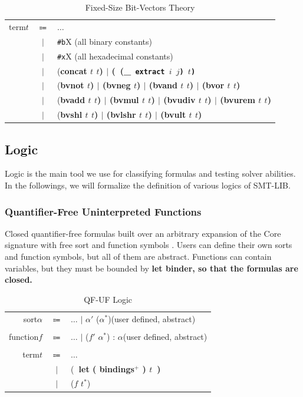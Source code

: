 \documentclass[10pt,twocolumn,letter]{article}
\theoremstyle{definition}
\begin{document}
\begin{table}[!h]
\begin{mdframed}
\begin{tabular}{r c l}
term\qquad $t$ & $\Coloneqq$ & $\ldots$ \\
& $\mid$ & {\tt \#b}X \rm\qquad (all binary constants)\\
& $\mid$ & {\tt \#x}X \rm\qquad (all hexadecimal constants)\\
& $\mid$ & (\bf concat \rm $t$ $t$) $\mid$ (\ (\_\tt\ {\bf extract} \rm $i$ $j$)\ $t$)\\
& $\mid$ & (\bf bvnot \rm $t$) $\mid$ (\bf bvneg \rm $t$) $\mid$ (\bf bvand \rm $t$ $t$) $\mid$ (\bf bvor \rm $t$ $t$)\\
& $\mid$ & (\bf bvadd \rm $t$ $t$) $\mid$ (\bf bvmul \rm $t$ $t$) $\mid$ (\bf bvudiv \rm $t$ $t$) $\mid$ (\bf bvurem \rm $t$ $t$)\\
& $\mid$ & (\bf bvshl \rm $t$ $t$) $\mid$ (\bf bvlshr \rm $t$ $t$) $\mid$ (\bf bvult \rm $t$ $t$) \\
\end{tabular}
\end{mdframed}
\caption{Fixed-Size Bit-Vectors Theory}
\end{table}


\subsection{Logic}

Logic is the main tool we use for classifying formulas and testing solver abilities. In the followings, we will formalize the definition of various logics of SMT-LIB.

\subsubsection{Quantifier-Free Uninterpreted Functions}
Closed quantifier-free formulas built over an arbitrary expansion of the Core signature with free sort and function symbols \cite{bs2010}. Users can define their own sorts and function symbols, but all of them are abstract. Functions can contain variables, but they must be bounded by \bf let \rm binder, so that the formulas are closed.

\begin{table}[!h]
\begin{mdframed}
\centering
\begin{tabular}{r c l}
sort\qquad $\alpha$ & $\Coloneqq$ & $\ldots$ $\mid$ $\alpha'$ ($\alpha^*$)\rm\qquad(user defined, abstract)\\
\\
function\qquad $f$ & $\Coloneqq$ & $\ldots$ $\mid$ \rm ($f'$ $\alpha^*$) : $\alpha$\qquad(user defined, abstract)\\
\\
term\qquad $t$ & $\Coloneqq$ & $\ldots$ \\
& $\mid$ & (\bf\ let \rm ( bindings$^+$ ) $t$\ )\\
& $\mid$ & ($f$ $t^*$)
\end{tabular}
\end{mdframed}
\caption{QF-UF Logic}
\end{table}
\end{document}
